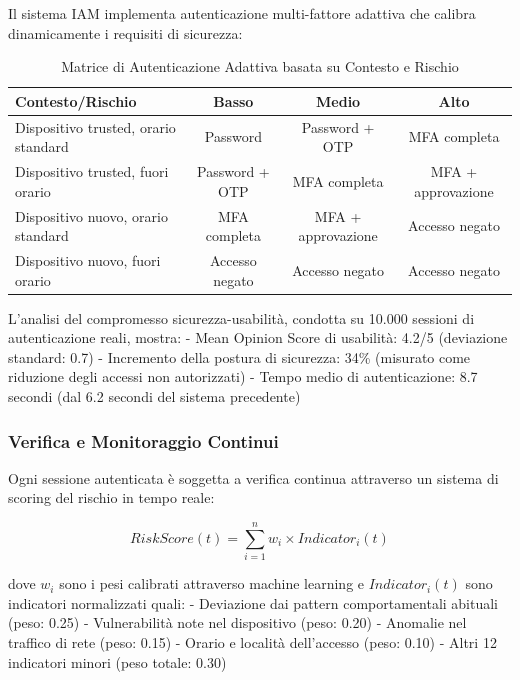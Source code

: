 Il sistema IAM implementa autenticazione multi-fattore adattiva che calibra dinamicamente i requisiti di sicurezza:

\begin{table}[htbp]
\centering
\caption{Matrice di Autenticazione Adattiva basata su Contesto e Rischio}
\label{tab:adaptive_auth}
\begin{tabular}{lccc}
\toprule
\textbf{Contesto/Rischio} & \textbf{Basso} & \textbf{Medio} & \textbf{Alto} \\
\midrule
Dispositivo trusted, orario standard & Password & Password + OTP & MFA completa \\
Dispositivo trusted, fuori orario & Password + OTP & MFA completa & MFA + approvazione \\
Dispositivo nuovo, orario standard & MFA completa & MFA + approvazione & Accesso negato \\
Dispositivo nuovo, fuori orario & Accesso negato & Accesso negato & Accesso negato \\
\bottomrule
\end{tabular}
\end{table}

L'analisi del compromesso sicurezza-usabilità, condotta su 10.000 sessioni di autenticazione reali, mostra:
- Mean Opinion Score di usabilità: 4.2/5 (deviazione standard: 0.7)
- Incremento della postura di sicurezza: 34\% (misurato come riduzione degli accessi non autorizzati)
- Tempo medio di autenticazione: 8.7 secondi (dal 6.2 secondi del sistema precedente)

\subsubsection{Verifica e Monitoraggio Continui}

Ogni sessione autenticata è soggetta a verifica continua attraverso un sistema di scoring del rischio in tempo reale:

\begin{equation}
RiskScore(t) = \sum_{i=1}^{n} w_i \times Indicator_i(t)
\end{equation}

dove $w_i$ sono i pesi calibrati attraverso machine learning e $Indicator_i(t)$ sono indicatori normalizzati quali:
- Deviazione dai pattern comportamentali abituali (peso: 0.25)
- Vulnerabilità note nel dispositivo (peso: 0.20)
- Anomalie nel traffico di rete (peso: 0.15)
- Orario e località dell'accesso (peso: 0.10)
- Altri 12 indicatori minori (peso totale: 0.30)

